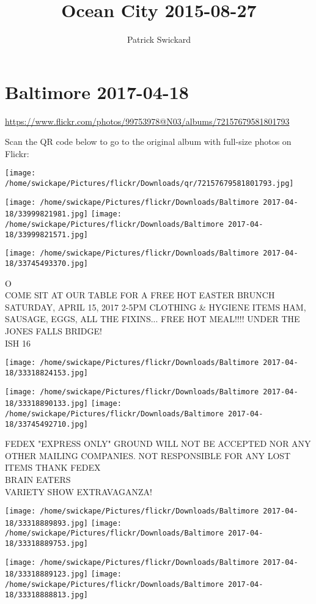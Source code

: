 \documentclass[10pt,letterpaper]{article}
\title{Ocean City 2015-08-27}
\author{Patrick Swickard}
\date{}
\begin{document}
\section*{Baltimore 2017-04-18}

\url{https://www.flickr.com/photos/99753978@N03/albums/72157679581801793}

Scan the QR code below to go to the original album with full-size photos on Flickr:

\texttt{[image: /home/swickape/Pictures/flickr/Downloads/qr/72157679581801793.jpg]}
\pagebreak

\texttt{[image: /home/swickape/Pictures/flickr/Downloads/Baltimore 2017-04-18/33999821981.jpg]}
\texttt{[image: /home/swickape/Pictures/flickr/Downloads/Baltimore 2017-04-18/33999821571.jpg]}

\texttt{[image: /home/swickape/Pictures/flickr/Downloads/Baltimore 2017-04-18/33745493370.jpg]}

O\\
COME SIT AT OUR TABLE FOR A FREE HOT EASTER BRUNCH SATURDAY, APRIL 15, 2017 2{-}5PM CLOTHING \& HYGIENE ITEMS HAM, SAUSAGE, EGGS, ALL THE FIXINS... FREE HOT MEAL!!!! UNDER THE JONES FALLS BRIDGE!\\
ISH 16
\pagebreak

\texttt{[image: /home/swickape/Pictures/flickr/Downloads/Baltimore 2017-04-18/33318824153.jpg]}

\vspace{0.25in}
\texttt{[image: /home/swickape/Pictures/flickr/Downloads/Baltimore 2017-04-18/33318890133.jpg]}
\texttt{[image: /home/swickape/Pictures/flickr/Downloads/Baltimore 2017-04-18/33745492710.jpg]}

FEDEX "EXPRESS ONLY" GROUND WILL NOT BE ACCEPTED NOR ANY OTHER MAILING COMPANIES.  NOT RESPONSIBLE FOR ANY LOST ITEMS THANK FEDEX\\
BRAIN EATERS\\
VARIETY SHOW EXTRAVAGANZA!
\pagebreak

\texttt{[image: /home/swickape/Pictures/flickr/Downloads/Baltimore 2017-04-18/33318889893.jpg]}
\texttt{[image: /home/swickape/Pictures/flickr/Downloads/Baltimore 2017-04-18/33318889753.jpg]}

\texttt{[image: /home/swickape/Pictures/flickr/Downloads/Baltimore 2017-04-18/33318889123.jpg]}
\texttt{[image: /home/swickape/Pictures/flickr/Downloads/Baltimore 2017-04-18/33318888813.jpg]}
\end{document}

